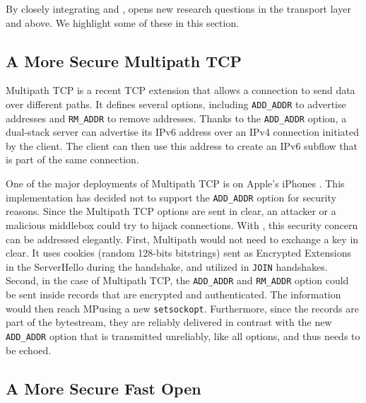 \label{sec:research}
By closely integrating \tcp and \tls, \tcpls opens new research questions
in the transport layer and above. We highlight some of these in this section.

\subsection{A More Secure Multipath TCP}

Multipath TCP \cite{rfc6824, rfc8684} is a recent TCP extension that allows a connection
to send data over different paths. It defines several \tcp options, including
\texttt{ADD\_ADDR} to advertise addresses and \texttt{RM\_ADDR} to remove addresses. Thanks to the \texttt{ADD\_ADDR} option, a dual-stack server can advertise
its IPv6 address over an IPv4 connection initiated by the client. The client can
then use this address to create an IPv6 subflow that is part of the same
connection.

One of the major deployments of Multipath TCP is on Apple's iPhones
\cite{bonaventure2016multipath}. This implementation has decided not to
support the \texttt{ADD\_ADDR} option for security reasons. Since the
Multipath TCP options are sent in clear, an attacker or
a malicious middlebox could try to hijack connections. 
With \tcpls, this
security concern can be addressed elegantly. First, Multipath \tcpls
would not need to exchange a key in clear. It uses cookies (random 128-bits
bitstrings) sent as Encrypted Extensions in the ServerHello during the
handshake, and utilized in \tcpls \texttt{JOIN} handshakes.
Second, in the case of Multipath TCP, the \texttt{ADD\_ADDR} and
\texttt{RM\_ADDR} option could be sent inside \tls records that are encrypted and
authenticated. The information would then reach MP\tcp using a new
\texttt{setsockopt}. Furthermore, since the \tls records are part of the bytestream,
they are reliably delivered in contrast with the new \texttt{ADD\_ADDR} option
that is transmitted unreliably, like all \tcp options, and thus needs to be
echoed.

\subsection{A More Secure \tcp Fast Open}

